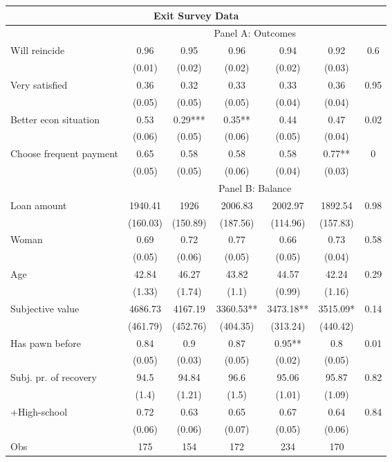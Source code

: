 \begin{tabular}{lcccccc}
\toprule
\multicolumn{7}{c}{Exit Survey Data} \\
\midrule
\midrule
      & \multicolumn{6}{c}{Panel A: Outcomes} \\
\midrule
\midrule
Will reincide & 0.96  & 0.95  & 0.96  & 0.94  & 0.92  & 0.6 \\
      & (0.01) & (0.02) & (0.02) & (0.02) & (0.03) &  \\
Very satisfied & 0.36  & 0.32  & 0.33  & 0.33  & 0.36  & 0.95 \\
      & (0.05) & (0.05) & (0.05) & (0.04) & (0.04) &  \\
Better econ situation & 0.53  & 0.29*** & 0.35** & 0.44  & 0.47  & 0.02 \\
      & (0.06) & (0.05) & (0.06) & (0.05) & (0.04) &  \\
Choose frequent payment & 0.65  & 0.58  & 0.58  & 0.58  & 0.77** & 0 \\
      & (0.05) & (0.05) & (0.06) & (0.04) & (0.03) &  \\
\midrule
      & \multicolumn{6}{c}{Panel B: Balance} \\
\midrule
\midrule
Loan amount  & 1940.41 & 1926  & 2006.83 & 2002.97 & 1892.54 & 0.98 \\
      & (160.03) & (150.89) & (187.56) & (114.96) & (157.83) &  \\
Woman & 0.69  & 0.72  & 0.77  & 0.66  & 0.73  & 0.58 \\
      & (0.05) & (0.06) & (0.05) & (0.05) & (0.04) &  \\
Age   & 42.84 & 46.27 & 43.82 & 44.57 & 42.24 & 0.29 \\
      & (1.33) & (1.74) & (1.1) & (0.99) & (1.16) &  \\
Subjective value & 4686.73 & 4167.19 & 3360.53** & 3473.18** & 3515.09* & 0.14 \\
      & (461.79) & (452.76) & (404.35) & (313.24) & (440.42) &  \\
Has pawn before & 0.84  & 0.9   & 0.87  & 0.95** & 0.8   & 0.01 \\
      & (0.05) & (0.03) & (0.05) & (0.02) & (0.05) &  \\
Subj. pr. of recovery & 94.5  & 94.84 & 96.6  & 95.06 & 95.87 & 0.82 \\
      & (1.4) & (1.21) & (1.5) & (1.01) & (1.09) &  \\
+High-school & 0.72  & 0.63  & 0.65  & 0.67  & 0.64  & 0.84 \\
      & (0.06) & (0.06) & (0.07) & (0.05) & (0.06) &  \\
Obs   & 175   & 154   & 172   & 234   & 170   &  \\
\bottomrule
\bottomrule
\end{tabular}%

